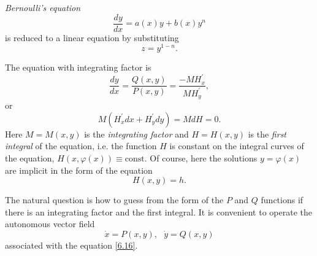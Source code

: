 \begin{example}
	\emph{Bernoulli's equation}
	$$
	\frac{dy}{dx}=a(x)y+b(x)y^{n}
	$$
	is reduced to a linear equation by substituting
	$$
	z=y^{1-n}.
	$$
\end{example}

\begin{example}
	The equation with integrating factor is
	$$
	\frac{dy}{dx}=\frac{Q(x,y)}{P(x,y)}=\frac{-MH_{x}^{\prime }}{MH_{y}^{\prime }%
	},
	$$
	or
	$$
	M(H_{x}^{\prime }dx+H_{y}^{\prime }dy)=MdH=0.
	$$
	Here $M = M (x, y)$ is the \emph{integrating factor} and $H = H (x, y)$ is the \emph{first integral} of the equation, i.e. the function $H$ is constant on the integral curves of the equation, $H(x,\varphi (x))\equiv \textrm{const}$. Of course, here the solutions $y=\varphi (x)$ are implicit in the form of the equation
	$$
	H(x,y)=h.
	$$
	
	The natural question is how to guess from the form of the $P$ and $Q$ functions if there is an integrating factor and the first integral. It is convenient to operate the autonomous vector field
	\begin{equation}
	\label{6.19}
	\dot{x}=P(x,y),\text{ \ \ }\dot{y}=Q(x,y)
	\end{equation}
	associated with the equation \eqref{6.16}.
	

\end{example}
